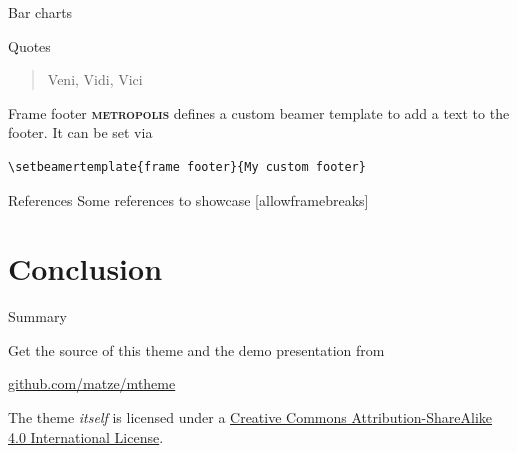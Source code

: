 \documentclass[10pt]{beamer}
\newcommand{\themename}{\textbf{\textsc{metropolis}}\xspace}
\begin{document}
\begin{frame}{Bar charts}
  \begin{figure}
  \end{figure}
\end{frame}
\begin{frame}{Quotes}
  \begin{quote}
    Veni, Vidi, Vici
  \end{quote}
\end{frame}

{%
\begin{frame}[fragile]{Frame footer}
    \themename defines a custom beamer template to add a text to the footer. It can be set via
    \begin{verbatim}\setbeamertemplate{frame footer}{My custom footer}\end{verbatim}
\end{frame}
}

\begin{frame}{References}
  Some references to showcase [allowframebreaks] \cite{knuth92,ConcreteMath,Simpson,Er01,greenwade93}
\end{frame}

\section{Conclusion}

\begin{frame}{Summary}

  Get the source of this theme and the demo presentation from

  \begin{center}\url{github.com/matze/mtheme}\end{center}

  The theme \emph{itself} is licensed under a
  \href{http://creativecommons.org/licenses/by-sa/4.0/}{Creative Commons
  Attribution-ShareAlike 4.0 International License}.

  \begin{center}\ccbysa\end{center}

\end{frame}
\end{document}

